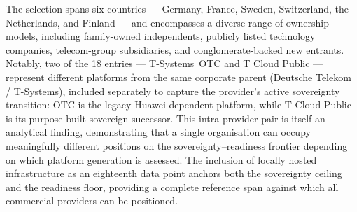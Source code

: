 The selection spans six countries — Germany, France, Sweden, Switzerland, the Netherlands, and Finland — and encompasses a diverse range of ownership models, including family-owned independents, publicly listed technology companies, telecom-group subsidiaries, and conglomerate-backed new entrants. Notably, two of the 18 entries — T-Systems~OTC and T Cloud Public — represent different platforms from the same corporate parent (Deutsche Telekom / T-Systems), included separately to capture the provider's active sovereignty transition: OTC is the legacy Huawei-dependent platform, while T Cloud Public is its purpose-built sovereign successor. This intra-provider pair is itself an analytical finding, demonstrating that a single organisation can occupy meaningfully different positions on the sovereignty–readiness frontier depending on which platform generation is assessed. The inclusion of locally hosted infrastructure as an eighteenth data point anchors both the sovereignty ceiling and the readiness floor, providing a complete reference span against which all commercial providers can be positioned.

